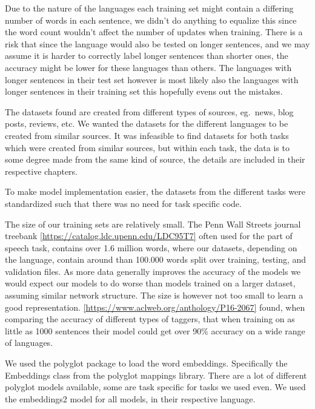 Due to the nature of the languages each training set might contain a differing
number of words in each sentence, we didn't do anything to equalize this since
the word count wouldn't affect the number of updates when training. There is a
risk that since the language would also be tested on longer sentences, and we
may assume it is harder to correctly label longer sentences than shorter ones,
the accuracy might be lower for these languages than others. The languages with
longer sentences in their test set however is most likely also the languages
with longer sentences in their training set this hopefully evens out the
mistakes.

The datasets found are created from different types of sources, eg.\ news, blog
posts, reviews, etc. We wanted the datasets for the different languages to be
created from similar sources. It was infeasible to find datasets for both tasks
which were created from similar sources, but within each task, the data is to
some degree made from the same kind of source, the details are included in their
respective chapters.

To make model implementation easier, the datasets from the different tasks were
standardized such that there was no need for task specific code.

The size of our training sets are relatively small. The Penn Wall Streets
journal treebank \ref{https://catalog.ldc.upenn.edu/LDC95T7} often used for the
part of speech task, contains over 1.6 million words, where our datasets,
depending on the language, contain around than 100.000 words split over
training, testing, and validation files. As more data generally improves the
accuracy of the models we would expect our models to do worse than models
trained on a larger dataset, assuming similar network structure. The size is
however not too small to learn a good representation.
\ref{https://www.aclweb.org/anthology/P16-2067} found, when comparing the
accuracy of different types of taggers, that when training on as little as 1000
sentences their model could get over 90\% accuracy on a wide range of languages.

We used the polyglot package to load the word embeddings. Specifically the
Embeddings class from the polyglot mappings library. There are a lot of
different polyglot models available, some are task specific for tasks we used
even. We used the embeddings2 model for all models, in their respective
language. 

\pagebreak
